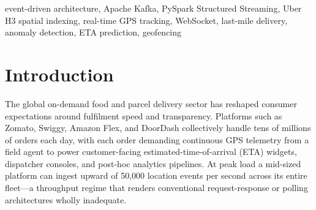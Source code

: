 \documentclass[conference]{IEEEtran}
\begin{document}
\begin{abstract}
On-demand delivery platforms must ingest high-frequency GPS telemetry from
large rider fleets, derive traffic intelligence from that stream, detect
anomalous agent behaviour, and serve sub-second arrival-time estimates to
customers—all simultaneously. Existing open solutions address these concerns
in isolation, leaving practitioners with fragmented, hard-to-integrate
components. This paper presents \textit{StreamRide}, a unified,
open-source, event-driven reference architecture that tackles all four
concerns within a single Kafka-centric pipeline. An OSRM-integrated Python
simulator produces realistic urban mobility traces across Hyderabad's road
network and publishes them to a \texttt{rider-location} Kafka topic. A
PySpark Structured Streaming job applies Uber H3 hexagonal indexing at
resolution\,8 for 30-second windowed density aggregation, executes
real-time inference of a gradient-boosted ETA regressor and an Isolation
Forest anomaly detector, and emits results to dedicated topics. A Node.js
consumer persists every event to MongoDB and fans out Socket.io
WebSocket pushes to a Leaflet.js browser dashboard that renders live
scooter markers, H3 choropleth heatmaps, ETA labels, and anomaly alert
pulses. Benchmark experiments with up to 10,000 simulated concurrent
riders show a P95 end-to-end latency of \textbf{98\,ms} and a sustained
throughput of \textbf{9,400\,events/s} on a single commodity workstation.
The XGBoost ETA model achieves a mean absolute error of
\textbf{2.4\,minutes} against a 5.1-minute naive baseline, and the
Isolation Forest detector reaches an AUC-ROC of \textbf{0.91}.
\end{abstract}

\begin{IEEEkeywords}
event-driven architecture, Apache Kafka, PySpark Structured Streaming,
Uber H3 spatial indexing, real-time GPS tracking, WebSocket, last-mile
delivery, anomaly detection, ETA prediction, geofencing
\end{IEEEkeywords}

\section{Introduction}

The global on-demand food and parcel delivery sector has reshaped
consumer expectations around fulfilment speed and transparency.
Platforms such as Zomato, Swiggy, Amazon Flex, and DoorDash
collectively handle tens of millions of orders each day, with each
order demanding continuous GPS telemetry from a field agent to
power customer-facing estimated-time-of-arrival (ETA) widgets,
dispatcher consoles, and post-hoc analytics pipelines. At peak
load a mid-sized platform can ingest upward of 50,000 location
events per second across its entire fleet—a throughput regime that
renders conventional request-response or polling architectures
wholly inadequate.
\end{document}
